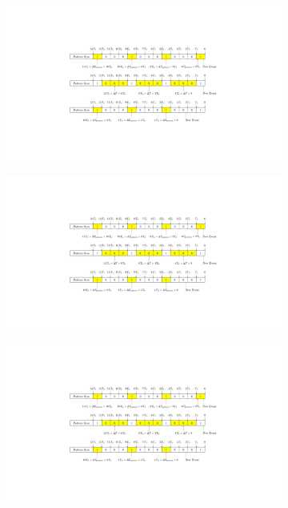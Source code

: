\begin{figure}[tb!]
  \centering
  \begin{subfigure}[t]{\textwidth}
    \centering
    \includegraphics[width=\textwidth]{figs/tir-helicity-prediction-a.pdf}
    \caption{\label{A1S2SS2F3a}}
  \end{subfigure}
  \begin{subfigure}[t]{\textwidth}
    \centering
    \includegraphics[width=\textwidth]{figs/tir-helicity-prediction-b.pdf}
    \caption{\label{A1S2SS2F3b}}
  \end{subfigure}
  \begin{subfigure}[t]{\textwidth}
    \centering
    \includegraphics[width=\textwidth]{figs/tir-helicity-prediction-c.pdf}

\end{subfigure}
\end{figure}
